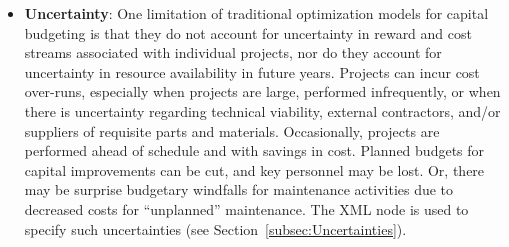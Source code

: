 \begin{itemize}
  \item \textbf{Uncertainty}: One limitation of traditional optimization models for capital
  budgeting is that they do not account for uncertainty in reward and cost streams associated
  with individual projects, nor do they account for uncertainty in resource availability in
  future years. Projects can incur cost over-runs, especially when projects are large, performed
  infrequently, or when there is uncertainty regarding technical viability, external contractors,
  and/or suppliers of requisite parts and materials. Occasionally, projects are performed ahead
  of schedule and with savings in cost. Planned budgets for capital improvements can be cut, and key
  personnel may be lost. Or, there may be surprise budgetary windfalls for maintenance activities
  due to decreased costs for “unplanned” maintenance. The XML node  is used
  to specify such uncertainties (see Section~\ref{subsec:Uncertainties}).



\end{itemize}

